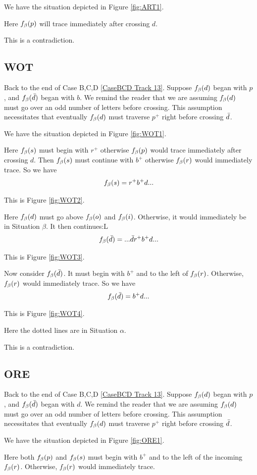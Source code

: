 We have the situation depicted in Figure \ref{fig:ART1}.

Here $f_\beta(p)$ will trace immediately after crossing $d$.

This is a contradiction.

\subsection{WOT}\label{WOT}
Back to the end of Case B,C,D \ref{CaseBCD Track 13}.
Suppose $f_\beta(d)$ began with $p$, and $f_\beta(\bar{d})$ began with $b$. We remind the reader that we are assuming $f_\beta(d)$ must go over an odd number of letters before crossing. This assumption necessitates that eventually $f_\beta(d)$ must traverse $p^+$ right before crossing $\bar{d}$.


We have the situation depicted in Figure \ref{fig:WOT1}.

Here $f_\beta(s)$ must begin with $r^+$ otherwise $f_\beta(p)$ would trace immediately after crossing $d$. Then $f_\beta(s)$ must continue with $b^+$ otherwise $f_\beta(r)$ would immediately trace. So we have
\[
f_\beta(s) = r^+ b^+ d...
\]

This is Figure \ref{fig:WOT2}.

Here $f_\beta(d)$ must go above $f_\beta(o)$ and $f_\beta(i)$. Otherwise, it would immediately be in Situation $\beta$. It then continues:L
\[
f_\beta(\bar{d}) = ...\bar{d} r^+ b^+ d...
\]

This is Figure \ref{fig:WOT3}.

Now consider $f_\beta(\bar{d})$. It must begin with $b^+$ and to the left of $f_\beta(r)$. Otherwise, $f_\beta(r)$ would immediately trace. So we have
\[
f_\beta(\bar{d}) = b^+ d...
\]

This is Figure \ref{fig:WOT4}. 

Here the dotted lines are in Situation $\alpha$.

This is a contradiction.


\subsection{ORE}\label{ORE}
Back to the end of Case B,C,D \ref{CaseBCD Track 13}.
Suppose $f_\beta(d)$ began with $p$, and $f_\beta(\bar{d})$ began with $d$. We remind the reader that we are assuming $f_\beta(d)$ must go over an odd number of letters before crossing. This assumption necessitates that eventually $f_\beta(d)$ must traverse $p^+$ right before crossing $\bar{d}$.


We have the situation depicted in Figure \ref{fig:ORE1}.

Here both $f_\beta(p)$ and $f_\beta(s)$ must begin with $b^+$ and to the left of the incoming $f_\beta(r)$. Otherwise, $f_\beta(r)$ would immediately trace.

